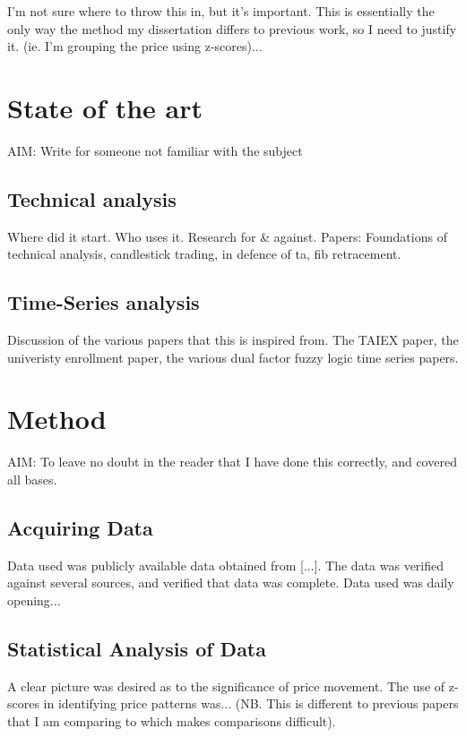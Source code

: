 \documentclass{article}
\begin{document}
I'm not sure where to throw this in, but it's important. This is essentially the only way the method my dissertation differs to previous work, so I need to justify it. (ie. I'm grouping the price using z-scores)...

\section{State of the art}

AIM: Write for someone not familiar with the subject

\subsection{Technical analysis}

Where did it start. Who uses it. Research for \& against. Papers: Foundations of technical analysis, candlestick trading, in defence of ta, fib retracement.

\subsection{Time-Series analysis}

Discussion of the various papers that this is inspired from. The TAIEX paper, the univeristy enrollment paper,  the various dual factor fuzzy logic time series papers.

\section{Method}

AIM: To leave no doubt in the reader that I have done this correctly, and covered all bases.

\subsection{Acquiring Data}

Data used was publicly available data obtained from [...]. The data was verified against several sources, and verified that data was complete. Data used was daily opening...

\subsection{Statistical Analysis of Data}

A clear picture was desired as to the significance of price movement. The use of z-scores in identifying price patterns was... (NB. This is different to previous papers that I am comparing to which makes comparisons difficult).
\end{document}

